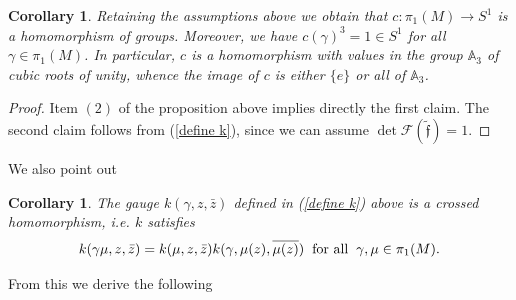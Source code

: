 \documentclass[a4paper,11pt]{amsart}
\newtheorem{corollary}[theorem]{Corollary}
\theoremstyle{definition}
\numberwithin{equation}{section}
\newcommand{\f}{\mathfrak{f}}
\begin{document}
 \begin{corollary}\label{cor:imc}
 Retaining the assumptions above we obtain that 
  $c: \pi_1 (M) \rightarrow S^1$ is a homomorphism of groups.
  Moreover,  we have $c(\gamma)^3=1 \in S^1$
 for all $\gamma \in  \pi_1(M)$. 
 In particular, $c$ is a homomorphism with
  values in the  group 
 $\mathbb{A}_3$ of cubic  
 roots of unity, whence the image of $c$ is either 
 $\{e \}$ or all of $\mathbb{A}_3$.
  \end{corollary}
  \begin{proof}
  Item $(2)$ of the proposition above implies directly the first claim.
  The second claim follows from (\ref{define k}), since we can assume $ \det  \mathcal{F}( \tilde{\f}) = 1$.
  \end{proof}
  
  We also point out
  \begin{corollary} 
  The gauge $k(\gamma,z, \bar z)$ defined in (\ref{define k}) above is a crossed homomorphism, i.e. $k$ satisfies
  \begin{equation} \label{crossed homomorphism}
  k(\gamma \mu, z, \bar z) = k(\mu, z, \bar z) k(\gamma, \mu(z), \overline{ \mu(z)}) 
  \hspace{2mm}  \text{for all} \hspace{2mm} \gamma,\mu \in \pi_1(M).
   \end{equation}
  \end{corollary}
  
  
  From this we derive the following
  
\end{document}
